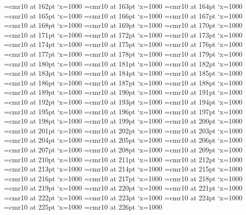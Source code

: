 \font\F=cmr10 at 162pt \efcode\F`x=1000
\font\F=cmr10 at 163pt \efcode\F`x=1000
\font\F=cmr10 at 164pt \efcode\F`x=1000
\font\F=cmr10 at 165pt \efcode\F`x=1000
\font\F=cmr10 at 166pt \efcode\F`x=1000
\font\F=cmr10 at 167pt \efcode\F`x=1000
\font\F=cmr10 at 168pt \efcode\F`x=1000
\font\F=cmr10 at 169pt \efcode\F`x=1000
\font\F=cmr10 at 170pt \efcode\F`x=1000
\font\F=cmr10 at 171pt \efcode\F`x=1000
\font\F=cmr10 at 172pt \efcode\F`x=1000
\font\F=cmr10 at 173pt \efcode\F`x=1000
\font\F=cmr10 at 174pt \efcode\F`x=1000
\font\F=cmr10 at 175pt \efcode\F`x=1000
\font\F=cmr10 at 176pt \efcode\F`x=1000
\font\F=cmr10 at 177pt \efcode\F`x=1000
\font\F=cmr10 at 178pt \efcode\F`x=1000
\font\F=cmr10 at 179pt \efcode\F`x=1000
\font\F=cmr10 at 180pt \efcode\F`x=1000
\font\F=cmr10 at 181pt \efcode\F`x=1000
\font\F=cmr10 at 182pt \efcode\F`x=1000
\font\F=cmr10 at 183pt \efcode\F`x=1000
\font\F=cmr10 at 184pt \efcode\F`x=1000
\font\F=cmr10 at 185pt \efcode\F`x=1000
\font\F=cmr10 at 186pt \efcode\F`x=1000
\font\F=cmr10 at 187pt \efcode\F`x=1000
\font\F=cmr10 at 188pt \efcode\F`x=1000
\font\F=cmr10 at 189pt \efcode\F`x=1000
\font\F=cmr10 at 190pt \efcode\F`x=1000
\font\F=cmr10 at 191pt \efcode\F`x=1000
\font\F=cmr10 at 192pt \efcode\F`x=1000
\font\F=cmr10 at 193pt \efcode\F`x=1000
\font\F=cmr10 at 194pt \efcode\F`x=1000
\font\F=cmr10 at 195pt \efcode\F`x=1000
\font\F=cmr10 at 196pt \efcode\F`x=1000
\font\F=cmr10 at 197pt \efcode\F`x=1000
\font\F=cmr10 at 198pt \efcode\F`x=1000
\font\F=cmr10 at 199pt \efcode\F`x=1000
\font\F=cmr10 at 200pt \efcode\F`x=1000
\font\F=cmr10 at 201pt \efcode\F`x=1000
\font\F=cmr10 at 202pt \efcode\F`x=1000
\font\F=cmr10 at 203pt \efcode\F`x=1000
\font\F=cmr10 at 204pt \efcode\F`x=1000
\font\F=cmr10 at 205pt \efcode\F`x=1000
\font\F=cmr10 at 206pt \efcode\F`x=1000
\font\F=cmr10 at 207pt \efcode\F`x=1000
\font\F=cmr10 at 208pt \efcode\F`x=1000
\font\F=cmr10 at 209pt \efcode\F`x=1000
\font\F=cmr10 at 210pt \efcode\F`x=1000
\font\F=cmr10 at 211pt \efcode\F`x=1000
\font\F=cmr10 at 212pt \efcode\F`x=1000
\font\F=cmr10 at 213pt \efcode\F`x=1000
\font\F=cmr10 at 214pt \efcode\F`x=1000
\font\F=cmr10 at 215pt \efcode\F`x=1000
\font\F=cmr10 at 216pt \efcode\F`x=1000
\font\F=cmr10 at 217pt \efcode\F`x=1000
\font\F=cmr10 at 218pt \efcode\F`x=1000
\font\F=cmr10 at 219pt \efcode\F`x=1000
\font\F=cmr10 at 220pt \efcode\F`x=1000
\font\F=cmr10 at 221pt \efcode\F`x=1000
\font\F=cmr10 at 222pt \efcode\F`x=1000
\font\F=cmr10 at 223pt \efcode\F`x=1000
\font\F=cmr10 at 224pt \efcode\F`x=1000
\font\F=cmr10 at 225pt \efcode\F`x=1000
\font\F=cmr10 at 226pt \efcode\F`x=1000
